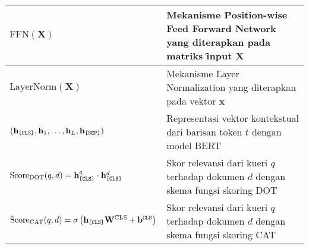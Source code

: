 \begin{longtable*}{| P{0.3\textwidth} |  P{0.7\textwidth} |}
    $\text{FFN}(\mathbf{X})$ & Mekanisme \f{Position-wise Feed Forward Network} yang diterapkan pada matriks \f{input} $\mathbf{X}$ \\ \hline
    $\text{LayerNorm}(\mathbf{X})$ & Mekanisme \f{Layer Normalization} yang diterapkan pada vektor $\mathbf{x}$ \\ \hline
    $(\mathbf{h}_{\texttt{[CLS]}}, \mathbf{h}_1, \dots, \mathbf{h}_L, \mathbf{h}_{\texttt{[SEP]}})$ & Representasi vektor kontekstual dari barisan token $t$ dengan model BERT \\ \hline
    $\text{Score}_{\text{DOT}}(q, d) = \mathbf{h}_{\texttt{[CLS]}}^q \cdot \mathbf{h}_{\texttt{[CLS]}}^d$ & Skor relevansi dari kueri $q$ terhadap dokumen $d$ dengan skema fungsi skoring DOT \\ \hline
    $\text{Score}_{\text{CAT}}(q, d) = \sigma\left(  \mathbf{h}_{\texttt{[CLS]}} \mathbf{W}^{\text{CLS}}+\mathbf{b}^{\texttt{CLS}} \right)$ & Skor relevansi dari kueri $q$ terhadap dokumen $d$ dengan skema fungsi skoring CAT \\ \hline
\end{longtable*}

    
